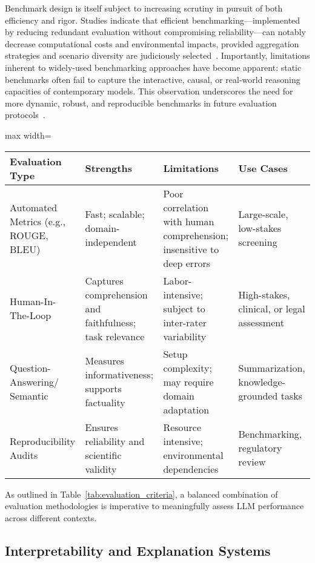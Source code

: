 Benchmark design is itself subject to increasing scrutiny in pursuit of both efficiency and rigor. Studies indicate that efficient benchmarking—implemented by reducing redundant evaluation without compromising reliability—can notably decrease computational costs and environmental impacts, provided aggregation strategies and scenario diversity are judiciously selected~\cite{ref101, ref108}. Importantly, limitations inherent to widely-used benchmarking approaches have become apparent: static benchmarks often fail to capture the interactive, causal, or real-world reasoning capacities of contemporary models. This observation underscores the need for more dynamic, robust, and reproducible benchmarks in future evaluation protocols~\cite{ref76, ref91, ref104}.

\begin{table*}[htbp]
\centering
\caption{Comparison of Model Evaluation Approaches: Key Criteria}
\label{tab:evaluation_criteria}
\begin{adjustbox}{max width=\textwidth}
\begin{tabular}{llll}
\toprule
\textbf{Evaluation Type} & \textbf{Strengths} & \textbf{Limitations} & \textbf{Use Cases} \\
\midrule
Automated Metrics (e.g., ROUGE, BLEU) & Fast; scalable; domain-independent & Poor correlation with human comprehension; insensitive to deep errors & Large-scale, low-stakes screening \\
Human-In-The-Loop & Captures comprehension and faithfulness; task relevance & Labor-intensive; subject to inter-rater variability & High-stakes, clinical, or legal assessment \\
Question-Answering/ Semantic & Measures informativeness; supports factuality & Setup complexity; may require domain adaptation & Summarization, knowledge-grounded tasks \\
Reproducibility Audits & Ensures reliability and scientific validity & Resource intensive; environmental dependencies & Benchmarking, regulatory review \\
\bottomrule
\end{tabular}
\end{adjustbox}
\end{table*}

As outlined in Table~\ref{tab:evaluation_criteria}, a balanced combination of evaluation methodologies is imperative to meaningfully assess LLM performance across different contexts.

\subsection{Interpretability and Explanation Systems}

